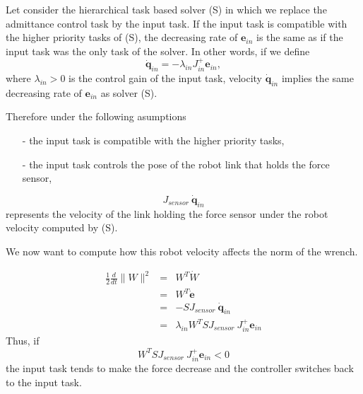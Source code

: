\documentclass{article}
\newcommand\dconf{\mathbf{\dot{q}}}
\newcommand\error{\mathbf{e}}
\newcommand\derror{\mathbf{\dot{e}}}
\begin{document}
Let consider the hierarchical task based solver (S) in which we replace the
admittance control task by the input task. If the input task is compatible
with the higher priority tasks of (S), the decreasing rate of $\error_{in}$ is
the same as if the input task was the only task of the solver. In other words, if we define
$$
\dconf_{in} = -\lambda_{in} J_{in}^{+}\error_{in},
$$
where $\lambda_{in} > 0$ is the control gain of the input task, velocity $\dconf_{in}$ implies the same decreasing rate of $\error_{in}$ as solver (S).

Therefore under the following asumptions
\begin{itemize}
\item[-] the input task is compatible with the higher priority tasks,
\item[-] the input task controls the pose of the robot link that holds the
force sensor,
\end{itemize}
$$
J_{sensor}\ \dconf_{in}
$$
represents the velocity of the link holding the force sensor under the robot
velocity computed by (S).

We now want to compute how this robot velocity affects the norm of the wrench.

\begin{eqnarray*}
  \frac{1}{2}\frac{d}{dt}\|W\|^2 &=& W^T\dot{W} \\
  &=& W^T\derror \\
  &=& -S J_{sensor}\ \dconf_{in} \\
  &=& \lambda_{in} W^T S J_{sensor}\ J_{in}^{+}\error_{in}
\end{eqnarray*}
Thus, if
$$
W^T S J_{sensor}\ J_{in}^{+}\error_{in} < 0
$$
the input task tends to make the force decrease and the controller switches back to the input task.
\end{document}
